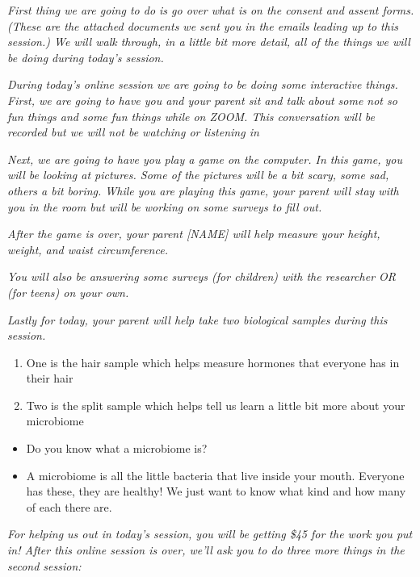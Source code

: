 \documentclass[]{book}
\providecommand{\tightlist}{%
  \setlength{\itemsep}{0pt}\setlength{\parskip}{0pt}}
\begin{document}
\emph{First thing we are going to do is go over what is on the consent and assent forms. (These are the attached documents we sent you in the emails leading up to this session.) We will walk through, in a little bit more detail, all of the things we will be doing during today's session.}

\emph{During today's online session we are going to be doing some interactive things. First, we are going to have you and your parent sit and talk about some not so fun things and some fun things while on ZOOM. This conversation will be recorded but we will not be watching or listening in}

\emph{Next, we are going to have you play a game on the computer. In this game, you will be looking at pictures. Some of the pictures will be a bit scary, some sad, others a bit boring. While you are playing this game, your parent will stay with you in the room but will be working on some surveys to fill out.}

\emph{After the game is over, your parent {[}NAME{]} will help measure your height, weight, and waist circumference.}

\emph{You will also be answering some surveys (for children) with the researcher OR (for teens) on your own.}

\emph{Lastly for today, your parent will help take two biological samples during this session.}

\begin{enumerate}
\def\labelenumi{\arabic{enumi}.}
\tightlist
\item
  One is the hair sample which helps measure hormones that everyone has in their hair
\item
  Two is the split sample which helps tell us learn a little bit more about your microbiome
\end{enumerate}

\begin{itemize}
\tightlist
\item
  Do you know what a microbiome is?
\item
  A microbiome is all the little bacteria that live inside your mouth. Everyone has these, they are healthy! We just want to know what kind and how many of each there are.
\end{itemize}

\emph{For helping us out in today's session, you will be getting \$45 for the work you put in! After this online session is over, we'll ask you to do three more things in the second session:}
\end{document}
